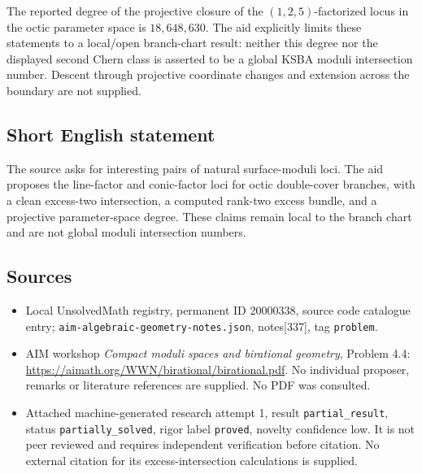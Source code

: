 \documentclass[11pt]{article}
\begin{document}
The reported degree of the projective closure of the $(1,2,5)$-factorized locus in the octic parameter space is $18{,}648{,}630$. The aid explicitly limits these statements to a local/open branch-chart result: neither this degree nor the displayed second Chern class is asserted to be a global KSBA moduli intersection number. Descent through projective coordinate changes and extension across the boundary are not supplied.
\subsection{Short English statement}
The source asks for interesting pairs of natural surface-moduli loci. The aid proposes the line-factor and conic-factor loci for octic double-cover branches, with a clean excess-two intersection, a computed rank-two excess bundle, and a projective parameter-space degree. These claims remain local to the branch chart and are not global moduli intersection numbers.
\subsection{Sources}
\begin{itemize}
\item Local UnsolvedMath registry, permanent ID 20000338, source code catalogue entry; \texttt{aim-algebraic-geometry-notes.json}, notes[337], tag \texttt{problem}.
\item AIM workshop \emph{Compact moduli spaces and birational geometry}, Problem 4.4: \url{https://aimath.org/WWN/birational/birational.pdf}. No individual proposer, remarks or literature references are supplied. No PDF was consulted.
\item Attached machine-generated research attempt 1, result \texttt{partial\_result}, status \texttt{partially\_solved}, rigor label \texttt{proved}, novelty confidence low. It is not peer reviewed and requires independent verification before citation. No external citation for its excess-intersection calculations is supplied.
\end{itemize}
\end{document}
